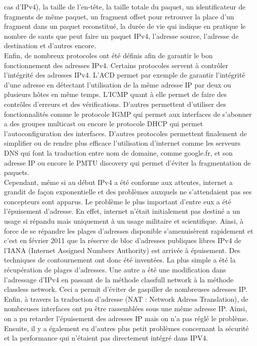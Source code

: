  cas d'IPv4), la taille de l'en-tête, la taille totale du paquet, un identificateur de 
fragments de même paquet, un fragment offset pour retrouver la place d'un fragment dans 
un paquet reconstitué, la durée de vie qui indique en pratique le nombre de sauts que 
peut faire un paquet IPv4, l'adresse source, l'adresse de destination et d'autres encore.
\\
Enfin, de nombreux protocoles ont été définis afin de garantir le bon fonctionnement des
 adresses IPv4. Certains protocoles servent à contrôler l'intégrité des adresses IPv4. L'ACD permet par exemple de garantir l'intégrité d'une adresse en détectant l'utilisation
de la même adresse IP par deux ou plusieurs hôtes en même temps. 
L'ICMP quant à elle permet de faire des contrôles d'erreurs et des vérifications.
D'autres permettent d'utiliser des fonctionnalités comme le protocole IGMP qui permet aux 
interfaces de s'abonner a des groupes multicast ou encore le protocole DHCP qui permet 
l'autoconfiguration des interfaces. D'autres protocoles permettent finalement de simplifier
 ou de rendre plus efficace  l'utilisation d'internet comme les serveurs DNS qui font la
 traduction entre nom de domaine, comme google.fr, et son adresse IP ou encore le PMTU 
discovery qui permet d'éviter la fragmentation de paquets.
\\
Cependant, même si au début IPv4 a été conforme aux attentes, internet a grandit de façon
 exponentielle et des problèmes auxquels ne s'attendaient pas ses concepteurs sont apparus.
Le problème le plus important d'entre eux a été l'épuisement d'adresse. En effet, internet n'était 
initialement pas destiné a un usage si répandu mais uniquement à un usage militaire et scientifique. 
Ainsi, à force de se répandre les plages d'adresses disponible s'amenuisèrent rapidement
 et c'est en février 2011 que la réserve de bloc d'adresses publiques libres IPv4 de
 l'IANA (Internet Assigned 
Numbers Authority) est arrivée à épuisement. Des techniques de contournement ont donc été
 inventées.  La plus simple a été la récupération de plages d'adresses. Une autre a été une
 modification dans l'adressage d'IPv4 en passant de la méthode classfull network à la
 méthode classless network. Ceci a permit d'éviter de gaspiller de nombreuses adresses
 IP. Enfin, à travers la traduction d'adresse (NAT : Network Adress Translation), de
 nombreuses interfaces ont pu être rassemblées sous une même adresse IP. Ainsi, on a pu
 retarder l'épuisement des adresses IP mais on n'a pas réglé le problème.
\\
Ensuite, il y a également eu d'autres plus petit problèmes concernant la sécurité et la performance qui n'étaient pas directement intégré dans IPV4. 
